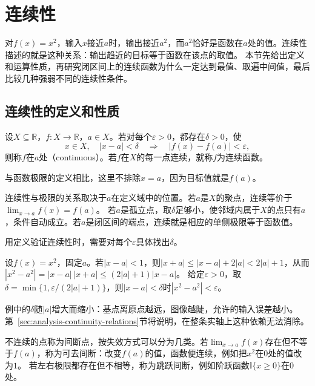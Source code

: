 \section{连续性}
\label{sec:ru-continuity}
\label{sec:analysis-local-models}
\label{sec:analysis-metric-continuity-extrema}

对$f(x)=x^2$，输入$x$接近$a$时，输出接近$a^2$，而$a^2$恰好是函数在$a$处的值。连续性描述的就是这种关系：输出趋近的目标等于函数在该点的取值。
本节先给出定义和运算性质，再研究闭区间上的连续函数为什么一定达到最值、取遍中间值，最后比较几种强弱不同的连续性条件。

\subsection{连续性的定义和性质}
\label{sec:ru-continuity-definition}

\begin{definition}[连续]
\label{def:analysis-continuity}
设$X\subseteq\mathbb R$，$f:X\to\mathbb R$，$a\in X$。若对每个$\varepsilon>0$，都存在$\delta>0$，使
\[
 x\in X,\quad|x-a|<\delta\quad\Longrightarrow\quad|f(x)-f(a)|<\varepsilon,
\]
则称$f$在$a$处（continuous）。若$f$在$X$的每一点连续，就称$f$为连续函数。
\end{definition}
与函数极限的定义相比，这里不排除$x=a$，因为目标值就是$f(a)$。

连续性与极限的关系取决于$a$在定义域中的位置。若$a$是$X$的聚点，连续等价于$\lim_{x\to a}f(x)=f(a)$。
若$a$是孤立点，取$\delta$足够小，使邻域内属于$X$的点只有$a$，条件自动成立。若$a$是闭区间的端点，连续就是相应的单侧极限等于函数值。

用定义验证连续性时，需要对每个$\varepsilon$具体找出$\delta$。
\begin{example}[平方函数在每一点连续]
\label{ex:analysis-square-pointwise-continuity}
设$f(x)=x^2$，固定$a$。若$|x-a|<1$，则$|x+a|\leq|x-a|+2|a|<2|a|+1$，从而$|x^2-a^2|=|x-a|\,|x+a|\leq(2|a|+1)|x-a|$。
给定$\varepsilon>0$，取$\delta=\min\{1,\varepsilon/(2|a|+1)\}$，则$|x-a|<\delta$时$|x^2-a^2|<\varepsilon$。
\end{example}
例中的$\delta$随$|a|$增大而缩小：基点离原点越远，图像越陡，允许的输入误差越小。第~\ref{sec:analysis-continuity-relations}节将说明，在整条实轴上这种依赖无法消除。

不连续的点称为间断点，按失效方式可以分为几类。若$\lim_{x\to a}f(x)$存在但不等于$f(a)$，称为可去间断：改变$f(a)$的值，函数便连续，例如把$x^2$在$0$处的值改为$1$。
若左右极限都存在但不相等，称为跳跃间断，例如阶跃函数$\mathbb I\{x\geq0\}$在$0$处。

